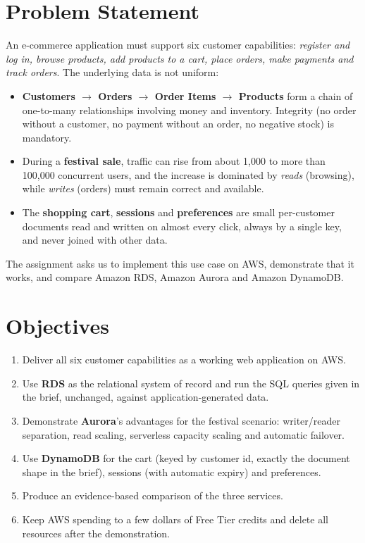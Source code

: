 \documentclass[11pt,a4paper]{article}
\begin{document}
\tableofcontents
\newpage

\section{Problem Statement}
An e-commerce application must support six customer capabilities: \emph{register and log in, browse products, add products to a cart, place orders, make payments and track orders}. The underlying data is not uniform:
\begin{itemize}
  \item \textbf{Customers $\rightarrow$ Orders $\rightarrow$ Order Items $\rightarrow$ Products} form a chain of one-to-many relationships involving money and inventory. Integrity (no order without a customer, no payment without an order, no negative stock) is mandatory.
  \item During a \textbf{festival sale}, traffic can rise from about 1{,}000 to more than 100{,}000 concurrent users, and the increase is dominated by \emph{reads} (browsing), while \emph{writes} (orders) must remain correct and available.
  \item The \textbf{shopping cart}, \textbf{sessions} and \textbf{preferences} are small per-customer documents read and written on almost every click, always by a single key, and never joined with other data.
\end{itemize}
The assignment asks us to implement this use case on AWS, demonstrate that it works, and compare Amazon RDS, Amazon Aurora and Amazon DynamoDB.

\section{Objectives}
\begin{enumerate}[label=\textbf{O\arabic*}]
  \item Deliver all six customer capabilities as a working web application on AWS.
  \item Use \textbf{RDS} as the relational system of record and run the SQL queries given in the brief, unchanged, against application-generated data.
  \item Demonstrate \textbf{Aurora}'s advantages for the festival scenario: writer/reader separation, read scaling, serverless capacity scaling and automatic failover.
  \item Use \textbf{DynamoDB} for the cart (keyed by customer id, exactly the document shape in the brief), sessions (with automatic expiry) and preferences.
  \item Produce an evidence-based comparison of the three services.
  \item Keep AWS spending to a few dollars of Free Tier credits and delete all resources after the demonstration.
\end{enumerate}
\end{document}
